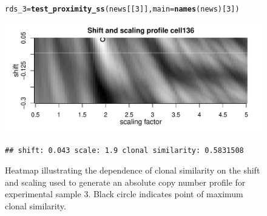 \documentclass[12pt]{article}\usepackage[]{graphicx}\usepackage[]{color}
\makeatletter
\newcommand{\hlnum}[1]{\textcolor[rgb]{0.686,0.059,0.569}{#1}}%
\newcommand{\hlstd}[1]{\textcolor[rgb]{0.345,0.345,0.345}{#1}}%
\newcommand{\hlkwb}[1]{\textcolor[rgb]{0.69,0.353,0.396}{#1}}%
\newcommand{\hlkwc}[1]{\textcolor[rgb]{0.333,0.667,0.333}{#1}}%
\newcommand{\hlkwd}[1]{\textcolor[rgb]{0.737,0.353,0.396}{\textbf{#1}}}%
\newenvironment{kframe}{%
 \def\at@end@of@kframe{}%
 \ifinner\ifhmode%
  \def\at@end@of@kframe{\end{minipage}}%
  \begin{minipage}{\columnwidth}%
 \fi\fi%
 \def\FrameCommand##1{\hskip\@totalleftmargin \hskip-\fboxsep
 \colorbox{shadecolor}{##1}\hskip-\fboxsep
     \hskip-\linewidth \hskip-\@totalleftmargin \hskip\columnwidth}%
 \MakeFramed {\advance\hsize-\width
   \@totalleftmargin\z@ \linewidth\hsize
   \@setminipage}}%
 {\par\unskip\endMakeFramed%
 \at@end@of@kframe}
\newenvironment{knitrout}{}{} %
\makeatother
\begin{document}
\begin{figure}[h!]
  \centering
\begin{knitrout}
\color{fgcolor}\begin{kframe}
\begin{alltt}
\hlstd{rds_3} \hlkwb{=} \hlkwd{test_proximity_ss}\hlstd{(news[[}\hlnum{3}\hlstd{]],} \hlkwc{main} \hlstd{=} \hlkwd{names}\hlstd{(news)[}\hlnum{3}\hlstd{])}
\end{alltt}
\end{kframe}
\includegraphics[width=.95\linewidth]{figure/unnamed-chunk-20-1} 
\begin{kframe}\begin{verbatim}
## shift: 0.043 scale: 1.9 clonal similarity: 0.5831508
\end{verbatim}
\end{kframe}
\end{knitrout}
\caption{Heatmap illustrating the dependence of clonal similarity on the shift and scaling used to generate an absolute copy number profile for experimental sample 3. Black circle indicates point of maximum clonal similarity.}
\label{fig:samp3_shift}
\end{figure}
\end{document}
